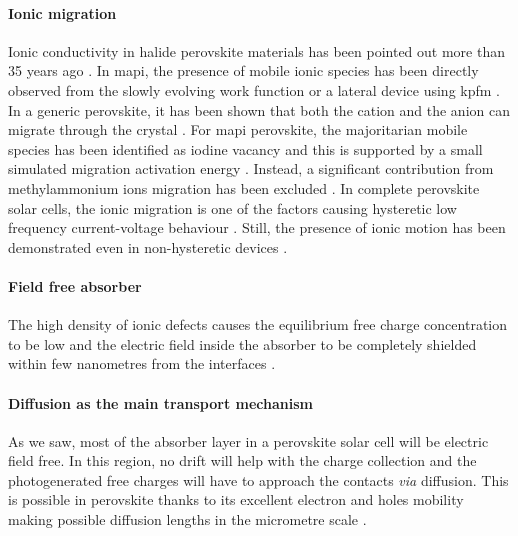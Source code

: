 	\paragraph{Ionic migration}\label{intro_ionic_migration}
	Ionic conductivity in halide perovskite materials has been pointed out more than 35 years ago \cite{Mizusaki1983,Yamada1995,Yamada1998}.
	In \gls{mapi}, the presence of mobile ionic species has been directly observed from the slowly evolving work function or a lateral device using \gls{kpfm} \cite{Birkhold2018,Birkhold2018a}.
	In a generic  perovskite, it has been shown that both the  cation and the  anion can migrate through the crystal \cite{SaifulIslam2000}.
	For \gls{mapi} perovskite, the majoritarian mobile species has been identified as iodine vacancy  \cite{Yang2015e,Senocrate2017} and this is supported by a small simulated migration activation energy \cite{Eames2015,Meloni2016,Haruyama2015,Azpiroz2015,Mosconi2016a}.
	Instead, a significant contribution from methylammonium ions migration has been excluded \cite{Senocrate2018,Senocrate2017,Meloni2016}.
	In complete perovskite solar cells, the ionic migration is one of the factors causing hysteretic low frequency current\hyp{}voltage behaviour \cite{Unger2014,Xiao2015,Meloni2016,Tress2015}.
	Still, the presence of ionic motion has been demonstrated even in non\hyp{}hysteretic devices \cite{Calado2016,Jacobs2018,Bryant2015}.

	

	\paragraph{Field free absorber}
	The high density of ionic defects causes the equilibrium free charge concentration to be low \cite{Walsh2015} and the electric field inside the absorber to be completely shielded within few nanometres from the interfaces \cite{Tress2015,Richardson2016}.


	\paragraph{Diffusion as the main transport mechanism}
	As we saw, most of the absorber layer in a perovskite solar cell will be electric field free.
	In this region, no drift will help with the charge collection and the photogenerated free charges will have to approach the contacts \textsl{via} diffusion.
	This is possible in perovskite thanks to its excellent electron and holes mobility \cite{Leijtens2014,Herz2017} making possible diffusion lengths in the micrometre scale \cite{Wehrenfennig2014,Wehrenfennig2014a,Stranks2013,Xing2013,Shi2015a,Eperon2014,Liu2017}.
	
